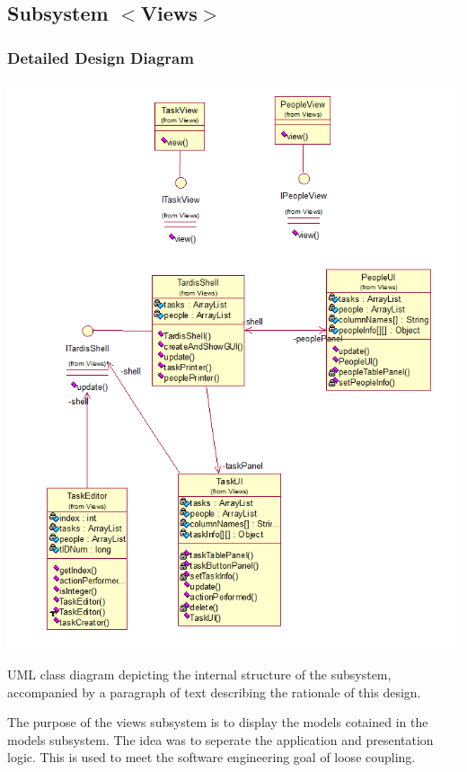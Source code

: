 \subsection{Subsystem $<$Views$>$}

\subsubsection{Detailed Design Diagram}
\includegraphics{subsystems/diagrams/views_class_diagram.png}

UML class diagram depicting the internal structure of the subsystem,
accompanied by a paragraph of text describing the rationale of this design.

The purpose of the views subsystem is to display the models cotained in the models subsystem. The idea was to seperate the application and presentation logic. This is used to meet the software engineering goal of loose coupling.

